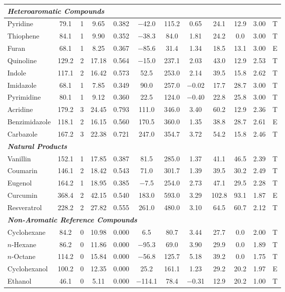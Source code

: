 \documentclass[12pt,a4paper]{article}
\begin{document}
\begin{small}
\begin{longtable}{@{}p{2.8cm}ccccccccccc@{}}
\midrule
\multicolumn{12}{l}{\textit{\textbf{Heteroaromatic Compounds}}} \\
\midrule
Pyridine & 79.1 & 1 & 9.65 & 0.382 & $-$42.0 & 115.2 & 0.65 & 24.1 & 12.9 & 3.00 & T \\
Thiophene & 84.1 & 1 & 9.90 & 0.352 & $-$38.3 & 84.0 & 1.81 & 24.2 & 0.0 & 3.00 & T \\
Furan & 68.1 & 1 & 8.25 & 0.367 & $-$85.6 & 31.4 & 1.34 & 18.5 & 13.1 & 3.00 & E \\
Quinoline & 129.2 & 2 & 17.18 & 0.564 & $-$15.0 & 237.1 & 2.03 & 43.0 & 12.9 & 2.53 & T \\
Indole & 117.1 & 2 & 16.42 & 0.573 & 52.5 & 253.0 & 2.14 & 39.5 & 15.8 & 2.62 & T \\
Imidazole & 68.1 & 1 & 7.85 & 0.349 & 90.0 & 257.0 & $-$0.02 & 17.7 & 28.7 & 3.00 & T \\
Pyrimidine & 80.1 & 1 & 9.12 & 0.360 & 22.5 & 124.0 & $-$0.40 & 22.8 & 25.8 & 3.00 & T \\
Acridine & 179.2 & 3 & 24.45 & 0.793 & 111.0 & 346.0 & 3.40 & 60.2 & 12.9 & 2.36 & T \\
Benzimidazole & 118.1 & 2 & 16.15 & 0.560 & 170.5 & 360.0 & 1.35 & 38.8 & 28.7 & 2.61 & E \\
Carbazole & 167.2 & 3 & 22.38 & 0.721 & 247.0 & 354.7 & 3.72 & 54.2 & 15.8 & 2.46 & T \\

\midrule
\multicolumn{12}{l}{\textit{\textbf{Natural Products}}} \\
\midrule
Vanillin & 152.1 & 1 & 17.85 & 0.387 & 81.5 & 285.0 & 1.37 & 41.1 & 46.5 & 2.39 & T \\
Coumarin & 146.1 & 2 & 18.42 & 0.543 & 71.0 & 301.7 & 1.39 & 39.5 & 30.2 & 2.49 & T \\
Eugenol & 164.2 & 1 & 18.95 & 0.385 & $-$7.5 & 254.0 & 2.73 & 47.1 & 29.5 & 2.28 & T \\
Curcumin & 368.4 & 2 & 42.15 & 0.540 & 183.0 & 593.0 & 3.29 & 102.8 & 93.1 & 1.87 & E \\
Resveratrol & 228.2 & 2 & 27.82 & 0.555 & 261.0 & 480.0 & 3.10 & 64.5 & 60.7 & 2.12 & T \\

\midrule
\multicolumn{12}{l}{\textit{\textbf{Non-Aromatic Reference Compounds}}} \\
\midrule
Cyclohexane & 84.2 & 0 & 10.98 & 0.000 & 6.5 & 80.7 & 3.44 & 27.7 & 0.0 & 2.00 & T \\
$n$-Hexane & 86.2 & 0 & 11.86 & 0.000 & $-$95.3 & 69.0 & 3.90 & 29.9 & 0.0 & 1.89 & T \\
$n$-Octane & 114.2 & 0 & 15.84 & 0.000 & $-$56.8 & 125.7 & 5.18 & 39.2 & 0.0 & 1.75 & T \\
Cyclohexanol & 100.2 & 0 & 12.35 & 0.000 & 25.2 & 161.1 & 1.23 & 29.2 & 20.2 & 1.97 & E \\
Ethanol & 46.1 & 0 & 5.11 & 0.000 & $-$114.1 & 78.4 & $-$0.31 & 12.9 & 20.2 & 1.00 & T \\

\end{longtable}
\end{small}
\end{document}
